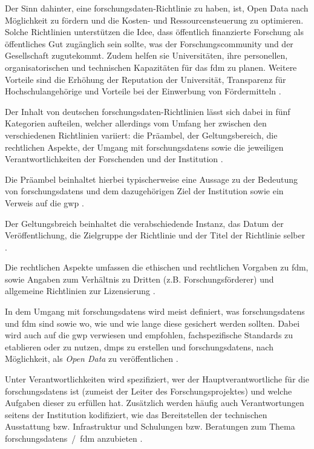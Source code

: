 Der Sinn dahinter, eine \gls{forschungsdaten}-Richtlinie zu haben, ist, Open Data nach Möglichkeit zu fördern und die Kosten- und Ressourcensteuerung zu optimieren.
Solche Richtlinien unterstützen die Idee, dass öffentlich finanzierte Forschung als öffentliches Gut zugänglich sein sollte, was der Forschungscommunity und der Gesellschaft zugutekommt.
Zudem helfen sie Universitäten, ihre personellen, organisatorischen und technischen Kapazitäten für das \gls{fdm} zu planen.
Weitere Vorteile sind die Erhöhung der Reputation der Universität, Transparenz für Hochschulangehörige und Vorteile bei der Einwerbung von Fördermitteln \autocite{Hiemenz2018-fdm-title,Hiemenz2018-fdm-report}.

Der Inhalt von deutschen \gls{forschungsdaten}-Richtlinien lässt sich dabei in fünf Kategorien aufteilen, welcher allerdings vom Umfang her zwischen den verschiedenen Richtlinien variiert:
die Präambel, der Geltungsbereich, die rechtlichen Aspekte, der Umgang mit \glspl{forschungsdaten} sowie die jeweiligen Verantwortlichkeiten der Forschenden und der Institution \autocite{Hiemenz2018-fdm-report}.

Die Präambel beinhaltet hierbei typischerweise eine Aussage zu der Bedeutung von \glspl{forschungsdaten} und dem dazugehörigen Ziel der Institution sowie ein Verweis auf die \gls{gwp} \autocite{Hiemenz2018-fdm-report}.

Der Geltungsbreich beinhaltet die verabschiedende Instanz, das Datum der Veröffentlichung, die Zielgruppe der Richtlinie und der Titel der Richtlinie selber \autocite{Hiemenz2018-fdm-report}.

Die rechtlichen Aspekte umfassen die ethischen und rechtlichen Vorgaben zu \gls{fdm}, sowie Angaben zum Verhältnis zu Dritten (z.B. Forschungsförderer) und allgemeine Richtlinien zur Lizensierung \autocite{Hiemenz2018-fdm-report}.

In dem Umgang mit \glspl{forschungsdaten} wird meist definiert, was \glspl{forschungsdaten} und \gls{fdm} sind sowie wo, wie und wie lange diese gesichert werden sollten.
Dabei wird auch auf die \gls{gwp} verwiesen und empfohlen, fachspezifische Standards zu etablieren oder zu nutzen, \glspl{dmp} zu erstellen und \glspl{forschungsdaten}, nach Möglichkeit, als \textit{Open Data} zu veröffentlichen \autocite{Hiemenz2018-fdm-report}.

Unter Verantwortlichkeiten wird spezifiziert, wer der Hauptverantwortliche für die \glspl{forschungsdaten} ist (zumeist der Leiter des Forschungsprojektes) und welche Aufgaben dieser zu erfüllen hat.
Zusätzlich werden häufig auch Verantwortungen seitens der Institution kodifiziert, wie das Bereitstellen der technischen Ausstattung bzw. Infrastruktur und Schulungen bzw. Beratungen zum Thema \glspl{forschungsdaten}~/~\gls{fdm} anzubieten \autocite{Hiemenz2018-fdm-report}.

